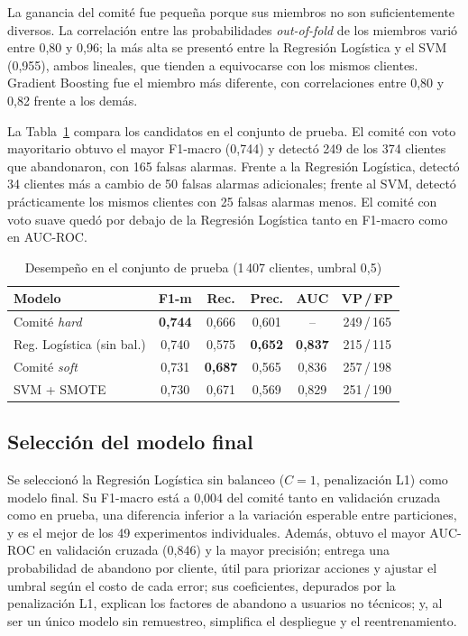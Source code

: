 \documentclass[conference]{IEEEtran}
\begin{document}
La ganancia del comité fue pequeña porque sus miembros no son suficientemente diversos. La correlación entre las probabilidades \emph{out-of-fold} de los miembros varió entre 0,80 y 0,96; la más alta se presentó entre la Regresión Logística y el SVM (0,955), ambos lineales, que tienden a equivocarse con los mismos clientes. Gradient Boosting fue el miembro más diferente, con correlaciones entre 0,80 y 0,82 frente a los demás.

La Tabla~\ref{tab:test} compara los candidatos en el conjunto de prueba. El comité con voto mayoritario obtuvo el mayor F1-macro (0,744) y detectó 249 de los 374 clientes que abandonaron, con 165 falsas alarmas. Frente a la Regresión Logística, detectó 34 clientes más a cambio de 50 falsas alarmas adicionales; frente al SVM, detectó prácticamente los mismos clientes con 25 falsas alarmas menos. El comité con voto suave quedó por debajo de la Regresión Logística tanto en F1-macro como en AUC-ROC.

\begin{table}[!t]
\caption{Desempeño en el conjunto de prueba (1\,407 clientes, umbral 0,5)}
\label{tab:test}
\centering
\footnotesize
\setlength{\tabcolsep}{3pt}
\begin{tabular}{@{}lccccc@{}}
\toprule
Modelo & F1-m & Rec. & Prec. & AUC & VP\,/\,FP \\
\midrule
Comité \emph{hard} & \textbf{0,744} & 0,666 & 0,601 & -- & 249\,/\,165 \\
Reg. Logística (sin bal.) & 0,740 & 0,575 & \textbf{0,652} & \textbf{0,837} & 215\,/\,115 \\
Comité \emph{soft} & 0,731 & \textbf{0,687} & 0,565 & 0,836 & 257\,/\,198 \\
SVM + SMOTE & 0,730 & 0,671 & 0,569 & 0,829 & 251\,/\,190 \\
\bottomrule
\end{tabular}
\end{table}

\subsection{Selección del modelo final}

Se seleccionó la Regresión Logística sin balanceo ($C=1$, penalización L1) como modelo final. Su F1-macro está a 0,004 del comité tanto en validación cruzada como en prueba, una diferencia inferior a la variación esperable entre particiones, y es el mejor de los 49 experimentos individuales. Además, obtuvo el mayor AUC-ROC en validación cruzada (0,846) y la mayor precisión; entrega una probabilidad de abandono por cliente, útil para priorizar acciones y ajustar el umbral según el costo de cada error; sus coeficientes, depurados por la penalización L1, explican los factores de abandono a usuarios no técnicos; y, al ser un único modelo sin remuestreo, simplifica el despliegue y el reentrenamiento.
\end{document}
